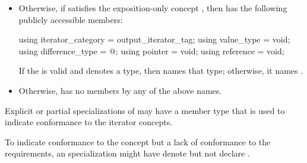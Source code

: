 \begin{itemize}
\begin{itemize}
\item If the   is valid and
denotes a type,  names that type.
Otherwise,  names:
\begin{itemize}
\item
{}
if
 satisfies ,
or otherwise
\item
{} if
 satisfies ,
or otherwise
\item
{} if
 satisfies ,
or otherwise
\item
{}.
\end{itemize}
\end{itemize}

\item
Otherwise, if  satisfies the exposition-only concept
, then 
has the following publicly accessible
members:
\begin{codeblock}
using iterator_category = output_iterator_tag;
using value_type        = void;
using difference_type   = @\seebelow@;
using pointer           = void;
using reference         = void;
\end{codeblock}
If the 
 is valid and denotes a type,
then  names that type; otherwise, it names .

\item
Otherwise, 
has no members by any of the above names.
\end{itemize}

\pnum
Explicit or partial specializations of  may
have a member type  that is used to indicate
conformance to the iterator concepts.
\begin{example}
To indicate conformance to the  concept
but a lack of conformance to
the  requirements,
an  specialization might have
 denote 
but not declare .
\end{example}

